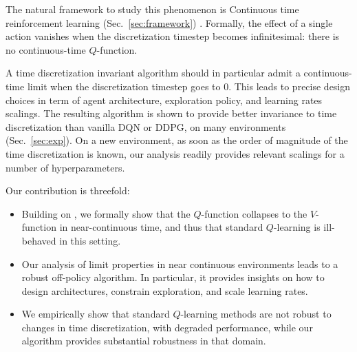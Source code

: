 The natural framework to study this phenomenon is Continuous time
reinforcement learning (Sec.~\ref{sec:framework}) \cite{cont_rl,
adv_upd}. Formally, the effect of a single action vanishes when the
discretization timestep becomes infinitesimal: there is no
continuous-time $Q$-function. 

A time discretization invariant algorithm should in particular admit a
continuous-time
limit when the discretization timestep goes to $0$.  This
leads to precise design choices in term of agent architecture, exploration
policy, and learning rates scalings.  The resulting algorithm is shown to
provide better invariance to time discretization than
vanilla DQN or DDPG, on many environments (Sec.~\ref{sec:exp}).  On a new environment, as soon as the
order of magnitude of the time discretization is known, our analysis readily
provides relevant scalings for a number of hyperparameters.


Our contribution is threefold:
\begin{itemize} 
\item Building on \cite{adv_upd}, we formally show that the $Q$-function collapses to the $V$-function in near-continuous time, and thus that
    standard $Q$-learning is ill-behaved in this setting.
  \item Our analysis of limit properties in near continuous environments leads to a robust off-policy algorithm. In particular,
    it provides insights on how to design architectures, constrain exploration, and scale learning rates.
  \item We empirically show that standard $Q$-learning methods are not
  robust to changes in time discretization, with degraded performance, while our algorithm provides
  substantial robustness in that domain.
\end{itemize}


